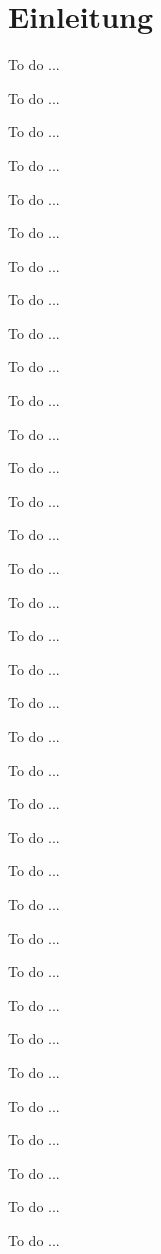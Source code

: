 \documentclass[nonacm,sigconf,natbib=false]{acmart}
\begin{document}

\maketitle

\section{Einleitung}
To do ...

To do ...

To do ...

To do ...

To do ...

To do ...

To do ...

To do ...

To do ...

To do ...

To do ...

To do ...

To do ...

To do ...

To do ...

To do ...

To do ...

To do ...

To do ...

To do ...

To do ...

To do ...

To do ...

To do ...

To do ...

To do ...

To do ...

To do ...

To do ...

To do ...

To do ...

To do ...

To do ...

To do ...

To do ...

To do ...
\end{document}
